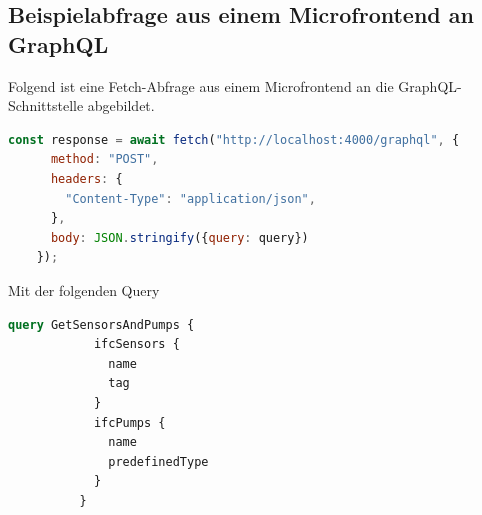\subsection{Beispielabfrage aus einem Microfrontend an GraphQL}
Folgend ist eine Fetch-Abfrage aus einem Microfrontend an die GraphQL-Schnittstelle abgebildet.
\begin{lstlisting}[language=Javascript, caption={Abfrage an GraphQL aus Microfrontend}, label={lst:graphql_request}]
const response = await fetch("http://localhost:4000/graphql", {
      method: "POST",
      headers: {
        "Content-Type": "application/json",
      },
      body: JSON.stringify({query: query})
    });
\end{lstlisting}
Mit der folgenden Query
\begin{lstlisting}[language=graphql, caption={GraphQL-Query um alle Sensoren und Pumpen zu erhalten}, label={lst:graphql_query}]
query GetSensorsAndPumps {
            ifcSensors {
              name
              tag
            }
            ifcPumps {
              name
              predefinedType
            }
          }
\end{lstlisting}
